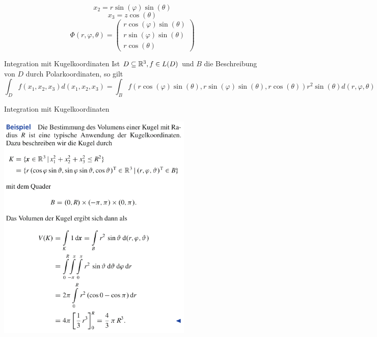 $$x_2=r \sin(\varphi)\sin(\theta)$$
$$x_3=z\cos(\theta)$$
$$\Phi(r, \varphi, \theta)=\begin{pmatrix}
    r \cos(\varphi)\sin(\theta) \\
    r \sin(\varphi)\sin(\theta) \\
    r \cos(\theta)
\end{pmatrix}$$
\begin{Def}{Integration mit Kugelkoordinaten}
Ist $D\subseteq \mathbb{R}^3, f\in L(D)$ und $B$ die Beschreibung von $D$ durch Polarkoordinaten, so gilt
$$\int_D f(x_1,x_2,x_3)d(x_1,x_2,x_3) = \int_B f(r \cos(\varphi)\sin(\theta), r \sin(\varphi)\sin(\theta),r \cos(\theta))r^2\sin(\theta) d(r, \varphi, \theta)$$
\end{Def}
\begin{Beispiel}{Integration mit Kugelkoordinaten}
        \begin{center}
    \includegraphics[width=0.7\textwidth]{Dateien/Kugelkoord.png}
\end{center}
\end{Beispiel}